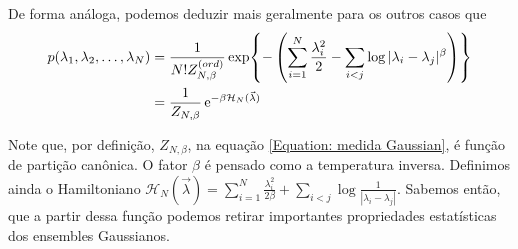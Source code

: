 De forma análoga, podemos deduzir mais geralmente para os outros casos que
\begin{equation}
	\begin{split}
		p(\lambda_1, \lambda_2, \dots, \lambda_N) 
		&= \frac{1}{ N! Z_{N, \beta}^{(ord)}} \exp{- \left(\sum_{i = 1}^{N} \frac{\lambda_i^2}{2} - \sum_{i < j} \log{|\lambda_i - \lambda_j|^{\beta}} \right)} \\
		&= \frac{1}{Z_{N, \beta}} \operatorname{\textrm e}^{-\beta \mathcal{H}_N(\vec{\lambda})}
	\end{split}
\label{Equation: medida Gaussian}
\end{equation}

Note que, por definição, $Z_{N, \beta}$, na equação \ref{Equation: medida Gaussian}, é função de partição canônica. O fator $\beta$ é pensado como a temperatura inversa. Definimos ainda o Hamiltoniano $\mathcal{H}_N(\vec{\lambda}) = \sum_{i = 1}^{N} \frac{\lambda_i^2}{2 \beta} + \sum_{i < j} \log{\frac{1}{|\lambda_i - \lambda_j|}}.$ Sabemos então, que a partir dessa função podemos retirar importantes propriedades estatísticas dos ensembles Gaussianos.

